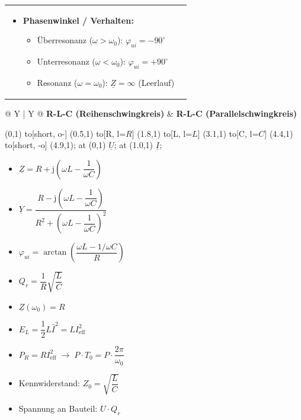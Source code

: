 \documentclass[a4paper,11pt]{article}
\begin{document}
\begin{tabularx}{\textwidth}{X X}
\begin{itemize}
\item \textbf{Phasenwinkel / Verhalten:}
\begin{itemize}
\item Überresonanz ($\omega > \omega_0$): $\varphi_{ui} = -90^\circ$
\item Unterresonanz ($\omega < \omega_0$): $\varphi_{ui} = +90^\circ$
\item Resonanz ($\omega = \omega_0$): $\underline{Z} = \infty$ (Leerlauf)
\end{itemize}
\end{itemize}
\\ \end{tabularx}

\noindent
\begin{tabularx}{\textwidth}{@{} Y | Y @{}}
\textbf{R-L-C (Reihenschwingkreis)} & \textbf{R-L-C (Parallelschwingkreis)} \\
\hline
\begin{minipage}[t]{\linewidth}\centering
\begin{circuitikz}[scale=0.8, transform shape]
\draw (0,1) to[short, o-] (0.5,1)
            to[R, l=$R$] (1.8,1)
            to[L, l=$L$] (3.1,1)
            to[C, l=$C$] (4.4,1)
            to[short, -o] (4.9,1);
\node[above=0.1cm] at (0,1) {\color{blue}$\underline{U}$};
\node[below=0.1cm] at (1.0,1) {\color{red}$\underline{I}$};
\end{circuitikz}

\vspace{3mm}

\begin{itemize}
  \item $\underline{Z} = R + \mathrm{j}\!\left(\omega L - \dfrac{1}{\omega C}\right)$
  \item $\underline{Y} = \dfrac{R - \mathrm{j}\!\left(\omega L - \dfrac{1}{\omega C}\right)}{R^2 + \left(\omega L - \dfrac{1}{\omega C}\right)^2}$
  \item $\varphi_{ui} = \arctan\!\left(\dfrac{\omega L - 1/\omega C}{R}\right)$
  \item $Q_r = \dfrac{1}{R}\sqrt{\dfrac{L}{C}}$
  \item $\underline{Z}(\omega_0) = R$
  \item $E_L = \dfrac{1}{2}L\hat{I}^2 = L I_{\mathrm{eff}}^2$
  \item $P_R = R I_{\mathrm{eff}}^2 \;\rightarrow\; P \cdot T_0 = P \cdot \dfrac{2\pi}{\omega_0}$
  \item Kennwiderstand: $Z_0 = \sqrt{\dfrac{L}{C}}$
  \item Spannung an Bauteil: $U \cdot Q_r$
\end{itemize}



\end{minipage}
\end{tabularx}
\end{document}
